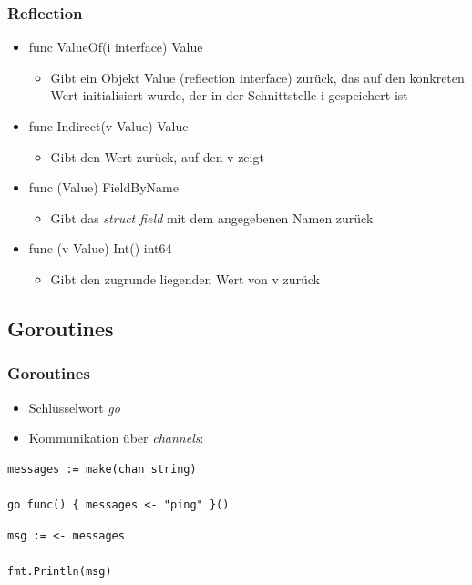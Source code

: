 \documentclass{beamer}
\begin{document}
\begin{frame}
\frametitle{Reflection}

\begin{itemize}
\setlength{\itemsep}{24pt}
\item func ValueOf(i interface{}) Value
\begin{itemize}
\item Gibt ein Objekt Value (reflection interface) zurück, das auf den konkreten Wert initialisiert wurde, der in der Schnittstelle i gespeichert ist
\end{itemize}
\item func Indirect(v Value) Value
\begin{itemize}
\item Gibt den Wert zurück, auf den v zeigt
\end{itemize}
\item func (Value) FieldByName
\begin{itemize}
\item Gibt das \textit{struct field} mit dem angegebenen Namen zur\"uck
\end{itemize}
\item func (v Value) Int() int64
\begin{itemize}
\item Gibt den zugrunde liegenden Wert von v zur\"uck
\end{itemize}
\end{itemize}

\end{frame}


\subsection{Goroutines}
\begin{frame}[fragile]
\frametitle{Goroutines}

\begin{itemize}
\setlength{\itemsep}{24pt}
\item Schl\"usselwort \textit{go}
\item Kommunikation \"uber \textit{channels}:
\end{itemize}

\begin{lstlisting}
messages := make(chan string)

go func() { messages <- "ping" }()
\end{lstlisting}

\begin{lstlisting}
msg := <- messages

fmt.Println(msg)
\end{lstlisting}

\end{frame}
\end{document}
